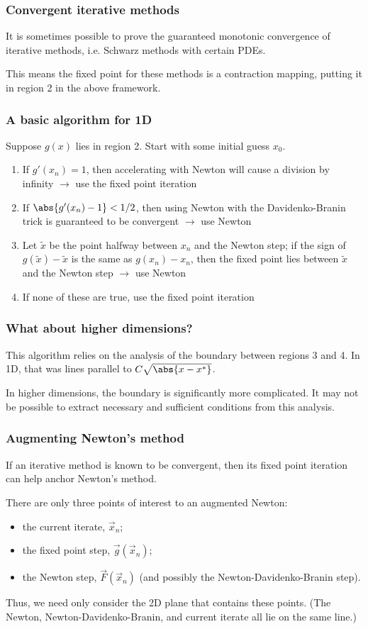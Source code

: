 \documentclass{beamer}
\begin{document}
\begin{frame}
\frametitle{Convergent iterative methods}

It is sometimes possible to prove the guaranteed monotonic convergence of iterative methods, i.e. Schwarz methods with certain PDEs.

This means the fixed point for these methods is a contraction mapping, putting it in region 2 in the above framework.

\end{frame}

\begin{frame}
\frametitle{A basic algorithm for 1D}

Suppose $g(x)$ lies in region 2.
Start with some initial guess $x_0$.
\begin{enumerate}
\item If $g'(x_n) = 1$, then accelerating with Newton will cause a division by infinity $\to$ use the fixed point iteration
\item If $\abs{g'(x_n) - 1} < 1/2$, then using Newton with the Davidenko-Branin trick is guaranteed to be convergent $\to$ use Newton
\item Let $\tilde{x}$ be the point halfway between $x_n$ and the Newton step; if the sign of $g(\tilde{x}) - \tilde{x}$ is the same as $g(x_n) - x_n$, then the fixed point lies between $\tilde{x}$ and the Newton step $\to$ use Newton
\item If none of these are true, use the fixed point iteration
\end{enumerate}
\end{frame}

\begin{frame}
\frametitle{What about higher dimensions?}

This algorithm relies on the analysis of the boundary between regions 3 and 4.
In 1D, that was lines parallel to $C \sqrt{\abs{x-x^*}}$.

In higher dimensions, the boundary is significantly more complicated.
It may not be possible to extract necessary and sufficient conditions from this analysis.

\end{frame}

\begin{frame}
\frametitle{Augmenting Newton's method}

If an iterative method is known to be convergent, then its fixed point iteration can help anchor Newton's method.

There are only three points of interest to an augmented Newton:
\begin{itemize}
\item the current iterate, $\vec{x}_n$;
\item the fixed point step, $\vec{g}(\vec{x}_n)$;
\item the Newton step, $\vec{F}(\vec{x}_n)$ (and possibly the Newton-Davidenko-Branin step).
\end{itemize}
Thus, we need only consider the 2D plane that contains these points.
(The Newton, Newton-Davidenko-Branin, and current iterate all lie on the same line.)

\end{frame}
\end{document}
